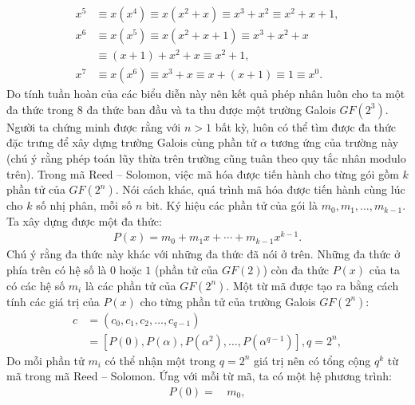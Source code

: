 \begin{multicols}{2}
\begin{align*}
		x^5&\equiv x(x^4 )\!\equiv \!x(x^2\!+\!x)\!\equiv\! x^3\!+\!x^2\!\equiv\! x^2\!+\!x\!+\!1,\\[-0.5ex]
		x^6&\equiv x(x^5 )\equiv x(x^2+x+1)\equiv x^3+x^2+x\\[-0.5ex]
		&\equiv(x+1)+x^2+x\equiv x^2+1,\\[-0.5ex]
		x^7&\equiv x(x^6 )\equiv x^3\!+\!x\equiv x\!+\!(x\!+\!1)\equiv 1\equiv x^0.
	\end{align*}
	Do tính tuần hoàn của các biểu diễn này nên kết quả phép nhân luôn cho ta một đa thức trong $8$ đa thức ban đầu và ta thu được một trường Galois $GF(2^3)$. Người ta chứng minh được rằng với $n>1$ bất kỳ, luôn có thể tìm được đa thức đặc trưng để xây dựng trường Galois cùng phần tử $\alpha$ tương ứng của trường này (chú ý rằng phép toán lũy thừa trên trường cũng tuân theo quy tắc nhân modulo trên).
	\vskip 0.05cm
	Trong mã Reed -- Solomon, việc mã hóa được tiến hành cho từng gói gồm $k$ phần tử của $GF(2^n)$. Nói cách khác, quá trình mã hóa được tiến hành cùng lúc cho $k$ số nhị phân, mỗi số $n$ bit. Ký hiệu các phần tử của gói là $m_0,m_1,\ldots,m_{k-1}$. Ta xây dựng được một đa thức:
	\begin{align*}
		P(x)=m_0+m_1x+ \cdots +m_{k-1} x^{k-1}.
	\end{align*}
	Chú ý rằng đa thức này khác với những đa thức đã nói ở trên. Những đa thức ở phía trên có hệ số là $0$ hoặc $1$ (phần tử của $GF(2)$) còn đa thức $P(x)$ của ta có các hệ số $m_i$ là các phần tử của $GF(2^n)$. Một từ mã được tạo ra bằng cách tính các giá trị của $P(x)$ cho từng phần tử của trường Galois $GF(2^n)$:
	\begin{align*}
	c &\!=\! \left(c_0,c_1,c_2,\ldots,c_{q-1}\right) \\[-0.5ex]
	&\!=\!\! \left[\!P(0), P(\!\alpha\!), P(\alpha^2), \ldots, P(\alpha^{q-1}\!)\!\right]\!,q \!=\! 2^n,
	\end{align*}
	Do mỗi phần tử $m_i$ có thể nhận một trong $q=2^n$ giá trị nên có tổng cộng $q^k$ từ mã trong mã Reed -- Solomon. Ứng với mỗi từ mã, ta có một hệ phương trình:
	\begin{align*}
		P(0)=\,&m_0, \\[-0.5ex]

\end{align*}
\end{multicols}
